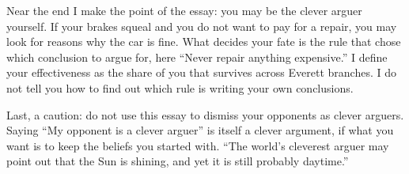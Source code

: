 Near the end I make the point of the essay: you may be the clever arguer yourself. If your brakes squeal and you do not want to pay for a repair, you may look for reasons why the car is fine. What decides your fate is the rule that chose which conclusion to argue for, here ``Never repair anything expensive.'' I define your effectiveness as the share of you that survives across Everett branches. I do not tell you how to find out which rule is writing your own conclusions. 

Last, a caution: do not use this essay to dismiss your opponents as clever arguers. Saying ``My opponent is a clever arguer'' is itself a clever argument, if what you want is to keep the beliefs you started with. ``The world's cleverest arguer may point out that the Sun is shining, and yet it is still probably daytime.'' 

